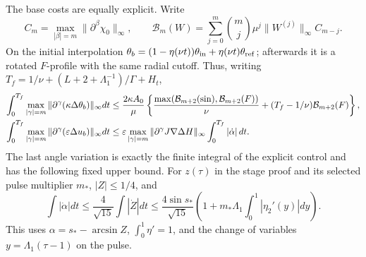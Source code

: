 The base costs are equally explicit. Write
\[
 C_m=\max_{|\beta|=m}\|\partial^\beta\chi_0\|_\infty,
 \qquad
 \mathcal B_m(W)=\sum_{j=0}^m\binom mj\mu^j
 \|W^{(j)}\|_\infty C_{m-j}.
\]
On the initial interpolation
$\theta_b=(1-\eta(\nu t))\theta_{\rm in}
+\eta(\nu t)\theta_{\rm ref}$; afterwards it is a rotated
$F$-profile with the same radial cutoff. Thus, writing
$T_f=1/\nu+(L+2+\Lambda_1^{-1})/\Gamma+H_t$,
\begin{align}
 \int_0^{T_f}\max_{|\gamma|=m}\|\partial^\gamma
 (\kappa\Delta\theta_b)\|_\infty dt
 &\leq\frac{2\kappa A_0}{\mu}
 \left\{\frac{\max(\mathcal B_{m+2}(\sin),\mathcal B_{m+2}(F))}{\nu}
 +(T_f-1/\nu)\mathcal B_{m+2}(F)\right\},\notag\\
 \int_0^{T_f}\max_{|\gamma|=m}\|\partial^\gamma
 (\varepsilon\Delta u_b)\|_\infty dt
 &\leq \varepsilon\max_{|\gamma|=m}
 \|\partial^\gamma J\nabla\Delta H\|_\infty
 \int_0^{T_f}|\dot\alpha|\,dt.\label{cvlane:eq:basecosts}
\end{align}
The last angle variation is exactly the finite integral of the
explicit control and has the following fixed upper bound. For
$z(\tau)$ in the stage proof and its selected pulse multiplier
$m_*$, $|Z|\leq1/4$, and
\[
 \int|\dot\alpha|dt\leq\frac4{\sqrt{15}}\int|\dot Z|dt
 \leq\frac{4\sin s_*}{\sqrt{15}}
 \left(1+m_*\Lambda_1\int_0^1|\eta_2'(y)|dy\right).
\]
This uses $\alpha=s_*-\arcsin Z$, $\int_0^1\eta'=1$, and
the change of variables $y=\Lambda_1(\tau-1)$ on the pulse.


